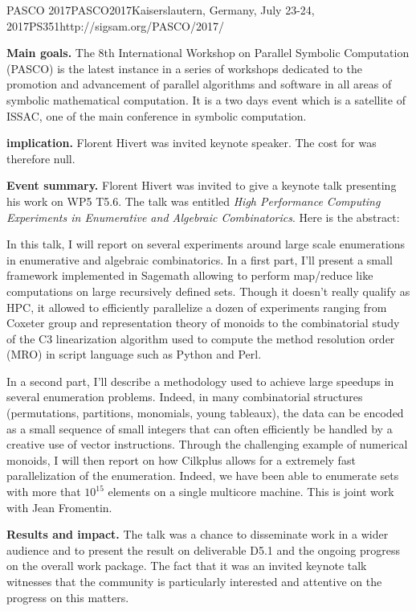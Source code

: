 \begin{event}{PASCO 2017}{PASCO2017}{Kaiserslautern, Germany, July 23-24, 2017}{PS}{35}{1}{http://sigsam.org/PASCO/2017/}

\textbf{Main goals.}
The 8th International Workshop on Parallel Symbolic Computation (PASCO) is the
latest instance in a series of workshops dedicated to the promotion and
advancement of parallel algorithms and software in all areas of symbolic
mathematical computation. It is a two days event which is a satellite of
ISSAC, one of the main conference in symbolic computation.

\textbf{\ODK implication.} Florent Hivert was invited keynote speaker. The cost
for \ODK was therefore null.

\textbf{Event summary.}
Florent Hivert was invited to give a keynote talk presenting his work on WP5
T5.6. The talk was entitled \emph{High Performance Computing Experiments in
  Enumerative and Algebraic Combinatorics}. Here is the abstract:

In this talk, I will report on several experiments around large scale
enumerations in enumerative and algebraic combinatorics.  In a first part,
I'll present a small framework implemented in Sagemath allowing to perform
map/reduce like computations on large recursively defined sets. Though it
doesn't really qualify as HPC, it allowed to efficiently parallelize a dozen
of experiments ranging from Coxeter group and representation theory of monoids
to the combinatorial study of the C3 linearization algorithm used to compute
the method resolution order (MRO) in script language such as Python and Perl.

In a second part, I'll describe a methodology used to achieve large speedups
in several enumeration problems. Indeed, in many combinatorial structures
(permutations, partitions, monomials, young tableaux), the data can be encoded
as a small sequence of small integers that can often efficiently be handled by
a creative use of vector instructions. Through the challenging example of
numerical monoids, I will then report on how Cilkplus allows for a extremely
fast parallelization of the enumeration. Indeed, we have been able to
enumerate sets with more that $10^15$ elements on a single multicore machine.
This is joint work with Jean Fromentin.

\textbf{Results and impact.} The talk was a chance to disseminate \ODK work in
a wider audience and to present the result on deliverable D5.1 and the ongoing
progress on the overall work package. The fact that it was an invited keynote
talk witnesses that the community is particularly interested and attentive on
the \ODK progress on this matters.

\end{event}
